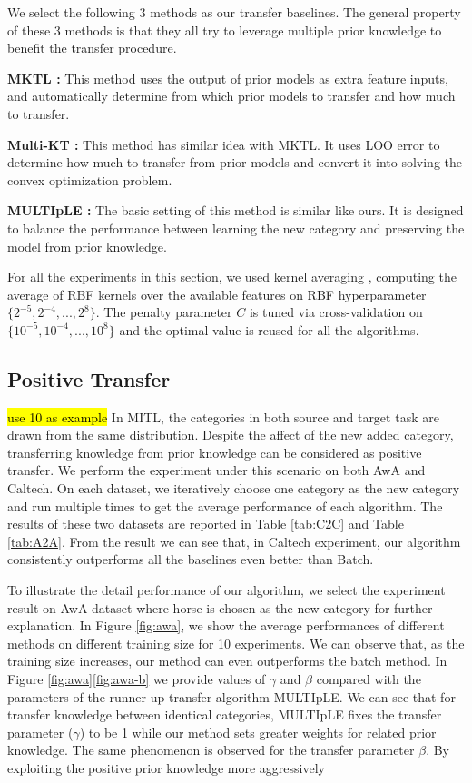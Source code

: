 We select the following 3 methods as our transfer baselines. The general property of these 3 methods is that they all try to leverage multiple prior knowledge to benefit the transfer procedure.

\textbf{MKTL \cite{jie2011multiclass}:} This method uses the output of prior models as extra feature inputs, and automatically determine from which prior models to transfer and how much to transfer.


\textbf{Multi-KT \cite{tommasi2014learning}:} This method has similar idea with MKTL. It uses LOO error to determine how much to transfer from prior models and convert it into solving the convex optimization problem.

\textbf{MULTIpLE \cite{kuzborskij2013n}:} The basic setting of this method is similar like ours. It is designed to balance the performance between learning the new category and preserving the model from prior knowledge.

For all the experiments in this section, we used kernel averaging \cite{gehler2009feature}, computing the average of RBF kernels over the available features on RBF hyperparameter $\{2^{-5},2^{-4},...,2^8\}$. The penalty parameter $C$ is tuned via cross-validation on $\{10^{-5},10^{-4},...,10^8\}$ and the optimal value is reused for all the algorithms.

\subsection{Positive Transfer}
\hl{use 10 as example}
In MITL, the categories in both source and target task are drawn from the same distribution. Despite the affect of the new added category, transferring knowledge from prior knowledge can be considered as positive transfer. We perform the experiment under this scenario on both AwA and Caltech. On each dataset, we iteratively choose one category as the new category and run multiple times to get the average performance of each algorithm. The results of these two datasets are reported in Table \ref{tab:C2C} and Table \ref{tab:A2A}. From the result we can see that, in Caltech experiment, our algorithm consistently outperforms all the baselines even better than Batch.  

To illustrate the detail performance of our algorithm, we select the experiment result on AwA dataset where horse is chosen as the new category for further explanation. In Figure \ref{fig:awa}, we show the average performances of different methods on different training size for 10 experiments. We can observe that, as the training size increases, our method can even outperforms the batch method.
In Figure \ref{fig:awa}\ref{fig:awa-b} we provide values of $\gamma$ and $\beta$ compared with the parameters of the runner-up transfer algorithm MULTIpLE. We can see that for transfer knowledge between identical categories, MULTIpLE fixes the transfer parameter ($\gamma$) to be 1 while our method sets greater weights for related prior knowledge. The same phenomenon is observed for the transfer parameter $\beta$. By exploiting the  positive prior knowledge more aggressively   
 

